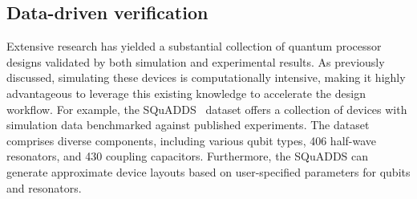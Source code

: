 \documentclass[a4paper,onecolumn,11pt,unpublished]{quantumarticle}
\begin{document}
\subsection{Data-driven verification}
Extensive research has yielded a substantial collection of quantum processor designs validated by both simulation and experimental results. As previously discussed, simulating these devices is computationally intensive, making it highly advantageous to leverage this existing knowledge to accelerate the design workflow. For example, the SQuADDS~\cite{Shanto2024SQuADDS} dataset offers a collection of devices with simulation data benchmarked against published experiments. The dataset comprises diverse components, including various qubit types, 406 half-wave resonators, and 430 coupling capacitors. Furthermore, the SQuADDS can generate approximate device layouts based on user-specified parameters for qubits and resonators.
\end{document}
